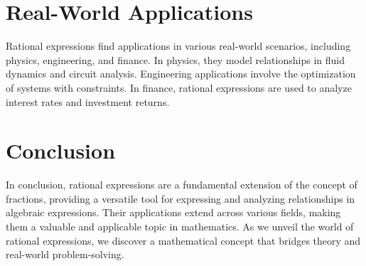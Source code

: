 \documentclass{article}
\begin{document}
\section*{Real-World Applications}
Rational expressions find applications in various real-world scenarios, including physics, engineering, and finance. In physics, they model relationships in fluid dynamics and circuit analysis. Engineering applications involve the optimization of systems with constraints. In finance, rational expressions are used to analyze interest rates and investment returns.

\section*{Conclusion}
In conclusion, rational expressions are a fundamental extension of the concept of fractions, providing a versatile tool for expressing and analyzing relationships in algebraic expressions. Their applications extend across various fields, making them a valuable and applicable topic in mathematics. As we unveil the world of rational expressions, we discover a mathematical concept that bridges theory and real-world problem-solving.
\end{document}
